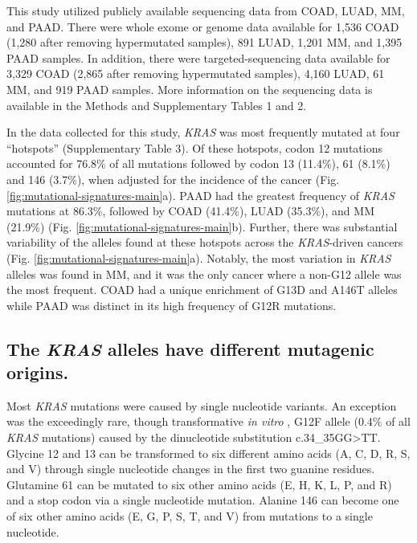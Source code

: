 \documentclass[english, 10pt, letterpaper]{article}
\newcommand{\KRAS}{\emph{KRAS}}
\begin{document}
This study utilized publicly available sequencing data from COAD, LUAD, MM, and PAAD.
There were whole exome or genome data available for 1,536 COAD (1,280 after removing hypermutated samples), 891 LUAD, 1,201 MM, and 1,395 PAAD samples.
In addition, there were targeted-sequencing data available for 3,329 COAD (2,865 after removing hypermutated samples), 4,160 LUAD, 61 MM, and 919 PAAD samples.
More information on the sequencing data is available in the Methods and Supplementary Tables 1 and 2.

In the data collected for this study, \KRAS{} was most frequently mutated at four “hotspots” (Supplementary Table 3). 
Of these hotspots, codon 12 mutations accounted for 76.8\% of all mutations followed by codon 13 (11.4\%), 61 (8.1\%) and 146 (3.7\%), when adjusted for the incidence of the cancer (Fig. \ref{fig:mutational-signatures-main}a).
PAAD had the greatest frequency of \KRAS{} mutations at 86.3\%, followed by COAD (41.4\%), LUAD (35.3\%), and MM (21.9\%) (Fig. \ref{fig:mutational-signatures-main}b).
Further, there was substantial variability of the alleles found at these hotspots across the \KRAS{}-driven cancers (Fig. \ref{fig:mutational-signatures-main}a). 
Notably, the most variation in \KRAS{} alleles was found in MM, and it was the only cancer where a non-G12 allele was the most frequent. 
COAD had a unique enrichment of G13D and A146T alleles while PAAD was distinct in its high frequency of G12R mutations.


\subsection*{The \KRAS{} alleles have different mutagenic origins.}

Most \KRAS{} mutations were caused by single nucleotide variants.
An exception was the exceedingly rare, though transformative \emph{in vitro} \cite{Barbacid1987}, G12F allele (0.4\% of all \KRAS{} mutations) caused by the dinucleotide substitution c.34\_35GG>TT.
Glycine 12 and 13 can be transformed to six different amino acids (A, C, D, R, S, and V) through single nucleotide changes in the first two guanine residues.
Glutamine 61 can be mutated to six other amino acids (E, H, K, L, P, and R) and a stop codon via a single nucleotide mutation.
Alanine 146 can become one of six other amino acids (E, G, P, S, T, and V) from mutations to a single nucleotide.
\end{document}

